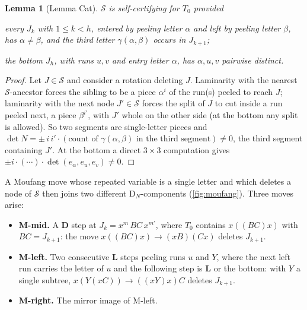 \documentclass[11pt,a4paper]{article}
\newtheorem{lemma}[thm]{Lemma}
\theoremstyle{definition}
\theoremstyle{remark}
\newcommand{\DN}{\mathrm{D}_N}
\newcommand{\cS}{\mathcal{S}}
\begin{document}
\begin{lemma}[Lemma Cat]\label{lem:Cat}
$\cS$ is self-certifying for $T_0$ provided
\begin{description}[font=\normalfont\itshape]
  \item[(C1)] every $J_k$ with $1\le k<h$, entered by peeling letter $\alpha$ and left by peeling letter
    $\beta$, has $\alpha\ne\beta$, and the third letter $\gamma(\alpha,\beta)$ occurs in $J_{k+1}$;
  \item[(C2)] the bottom $J_h$, with runs $u,v$ and entry letter $\alpha$, has $\alpha,u,v$ pairwise
    distinct.
\end{description}
\end{lemma}
\begin{proof}
Let $J\in\cS$ and consider a rotation deleting $J$. Laminarity with the nearest $\cS$-ancestor forces
the sibling to be a piece $\alpha^i$ of the run(s) peeled to reach $J$; laminarity with the next node
$J'\in\cS$ forces the split of $J$ to cut inside a run peeled next, a piece $\beta^{i'}$, with $J'$ whole
on the other side (at the bottom any split is allowed). So two segments are single-letter pieces and
$\det N=\pm\,i\,i'\cdot(\text{count of }\gamma(\alpha,\beta)\text{ in the third segment})\ne0$, the
third segment containing $J'$. At the bottom a direct $3\times3$ computation gives
$\pm i\cdot(\cdots)\cdot\det(e_\alpha,e_u,e_v)\ne0$.
\end{proof}

A Moufang move whose repeated variable is a single letter and which deletes a node of $\cS$ then joins
two different $\DN$-components (\cref{fig:moufang}). Three moves arise:
\begin{itemize}
  \item \textbf{M-mid.} A \textbf{D} step at $J_k=x^m\,BC\,x^{m'}$, where $T_0$ contains $x((BC)x)$ with
    $BC=J_{k+1}$: the move $x((BC)x)\to(xB)(Cx)$ deletes $J_{k+1}$.
  \item \textbf{M-left.} Two consecutive \textbf{L} steps peeling runs $u$ and $Y$, where the next left
    run carries the letter of $u$ and the following step is \textbf{L} or the bottom: with $Y$ a single
    subtree, $x(Y(xC))\to((xY)x)C$ deletes $J_{k+1}$.
  \item \textbf{M-right.} The mirror image of M-left.
\end{itemize}
\end{document}
